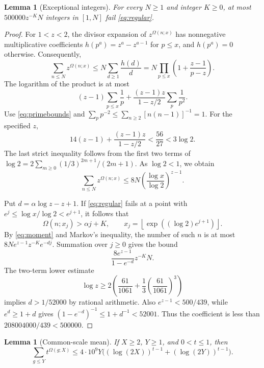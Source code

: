 \documentclass[11pt]{amsart}
\newtheorem{lemma}[theorem]{Lemma}
\theoremstyle{definition}
\theoremstyle{remark}
\numberwithin{equation}{section}
\newcommand{\Om}{\Omega}
\newcommand{\floor}[1]{\left\lfloor #1\right\rfloor}
\begin{document}
\begin{lemma}[Exceptional integers]\label{lem:exceptional}
For every $N\ge1$ and integer $K\ge0$, at most $500000z^{-K}N$ integers in $[1,N]$ fail \eqref{eq:regular}.
\end{lemma}

\begin{proof}
For $1<z<2$, the divisor expansion of $z^{\Om(n;x)}$ has nonnegative multiplicative coefficients
$h(p^a)=z^a-z^{a-1}$ for $p\le x$, and $h(p^a)=0$ otherwise.
Consequently,
\begin{equation}\label{eq:momentproduct}
\sum_{n\le N}z^{\Om(n;x)}
\le N\sum_{d\ge1}\frac{h(d)}d
=N\prod_{p\le x}\left(1+\frac{z-1}{p-z}\right).
\end{equation}
The logarithm of the product is at most
\[
(z-1)\sum_{p\le x}\frac1p
+\frac{(z-1)z}{1-z/2}\sum_p\frac1{p^2}.
\]
Use \eqref{eq:primebounds} and $\sum_p p^{-2}\le\sum_{n\ge2}[n(n-1)]^{-1}=1$.
For the specified $z$,
\[
14(z-1)+\frac{(z-1)z}{1-z/2}<\frac{56}{27}<3\log2.
\]
The last strict inequality follows from the first two terms of
$\log2=2\sum_{m\ge0}(1/3)^{2m+1}/(2m+1)$.
As $\log2<1$, we obtain
\begin{equation}\label{eq:moment}
\sum_{n\le N}z^{\Om(n;x)}
\le8N\left(\frac{\log x}{\log2}\right)^{z-1}.
\end{equation}

Put $d=\alpha\log z-z+1$.
If \eqref{eq:regular} fails at a point with
$e^j\le\log x/\log2<e^{j+1}$, it follows that
\[
\Om(n;x_j)>\alpha j+K,
\qquad x_j=\floor{\exp((\log2)e^{j+1})}.
\]
By \eqref{eq:moment} and Markov's inequality, the number of such $n$ is at most
$8Ne^{z-1}z^{-K}e^{-dj}$.
Summation over $j\ge0$ gives the bound
\[
\frac{8e^{z-1}}{1-e^{-d}}z^{-K}N.
\]
The two-term lower estimate
\[
\log z\ge2\left(\frac{61}{1061}+\frac13\left(\frac{61}{1061}\right)^3\right)
\]
implies $d>1/52000$ by rational arithmetic.
Also $e^{z-1}<500/439$, while $e^d\ge1+d$ gives
$(1-e^{-d})^{-1}\le1+d^{-1}<52001$.
Thus the coefficient is less than $208004000/439<500000$.
\end{proof}

\begin{lemma}[Common-scale mean]\label{lem:mean}
If $X\ge2$, $Y\ge1$, and $0<t\le1$, then
\begin{equation}\label{eq:mean}
\sum_{g\le Y}t^{\Om(g;X)}
\le4\cdot10^9Y\bigl((\log(2X))^{t-1}+(\log(2Y))^{t-1}\bigr).
\end{equation}
\end{lemma}
\end{document}
